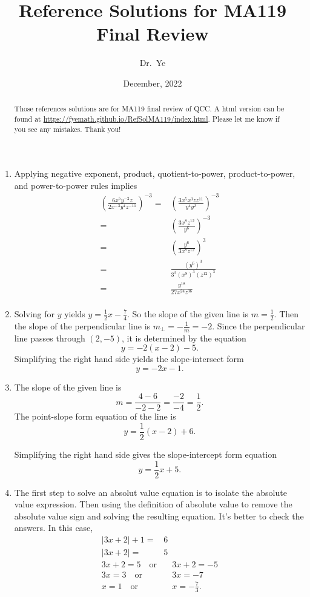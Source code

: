 \documentclass[
  12pt]{article}
\title{Reference Solutions for MA119 Final Review}
\author{Dr.~Ye}
\date{December, 2022}
\begin{document}
\maketitle
\begin{abstract}
Those references solutions are for MA119 final review of QCC. A html
version can be found at
\url{https://fyemath.github.io/RefSolMA119/index.html}. Please let me
know if you see any mistakes. Thank you!
\end{abstract}
\ifdefined\Shaded\renewenvironment{Shaded}{\begin{tcolorbox}[borderline west={3pt}{0pt}{shadecolor}, sharp corners, interior hidden, boxrule=0pt, frame hidden, enhanced, breakable]}{\end{tcolorbox}}\fi

\begin{enumerate}
\def\labelenumi{\arabic{enumi}.}
\item
  Applying negative exponent, product, quotient-to-power,
  product-to-power, and power-to-power rules implies \[
   \begin{aligned}
   \left(\frac{6x^5y^{-2}z}{2x^{-3}y^4z^{-11}}\right)^{-3}=&\left(\frac{3x^5x^3zz^{11}}{y^4y^2}\right)^{-3}\\
   =&\left(\frac{3x^8z^{12}}{y^6}\right)^{-3}\\
   =&\left(\frac{y^6}{3x^8z^{12}}\right)^3\\
   =&\frac{(y^6)^3}{3^3(x^8)^3(z^{12})^3}\\
   =&\frac{y^{18}}{27x^{24}z^{36}}\\
   \end{aligned}
   \]
\item
  Solving for \(y\) yields \(y=\frac12x-\frac74\). So the slope of the
  given line is \(m=\frac12\). Then the slope of the perpendicular line
  is \(m_\perp=-\frac1m=-2\). Since the perpendicular line passes
  through \((2,-5)\), it is determined by the equation \[y=-2(x-2)-5.\]
  Simplifying the right hand side yields the slope-intersect form
  \[y=-2x-1.\]
\item
  The slope of the given line is
  \[m=\frac{4-6}{-2-2}=\frac{-2}{-4}=\frac12.\] The point-slope form
  equation of the line is \[y=\frac12(x-2)+6.\]

  Simplifying the right hand side gives the slope-intercept form
  equation \[y=\frac12x+5.\]
\item
  The first step to solve an absolut value equation is to isolate the
  absolute value expression. Then using the definition of absolute value
  to remove the absolute value sign and solving the resulting equation.
  It's better to check the answers. In this case, \[
   \begin{aligned}
   |3x+2|+1=&6\\
   |3x+2|=&5\\
   3x+2=5\quad\text{or}&\quad 3x+2=-5\\
   3x=3\quad\text{or}&\quad 3x=-7\\
   x=1\quad\text{or}&\quad x=-\frac73.
   \end{aligned}
   \]


\end{enumerate}
\end{document}

